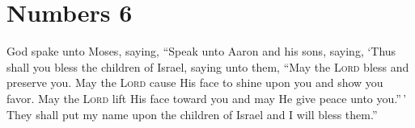 \section{Numbers 6}\label{Numbers 6}
\begin{enumerate}[align=center]
     God spake unto Moses, saying,%
     ``Speak unto Aaron and his sons, saying, `Thus shall you bless the children of Israel, saying unto them,%
     ``May the \textsc{Lord} bless and preserve you.%
     May the \textsc{Lord} cause His face to shine upon you and show you favor.%
     May the \textsc{Lord} lift His face toward you and may He give peace unto you.''\,'%
     They shall put my name upon the children of Israel and I will bless them.''%
\end{enumerate}
